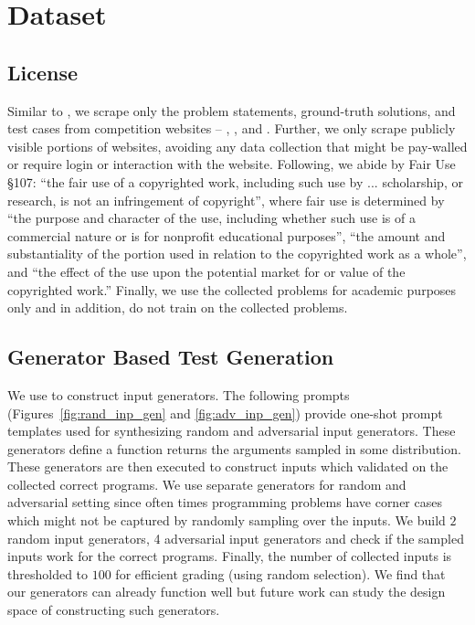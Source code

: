 \section{Dataset}

\subsection{License}
Similar to \citet{hendrycks2021measuring}, we scrape only the problem statements, ground-truth solutions, and test cases from competition websites -- \leetcode{}, \atcoder{}, and \codeforces{}. 
Further, we only scrape publicly visible portions of websites, avoiding any data collection that might be pay-walled or require login or interaction with the website.
Following, \citet{hendrycks2021measuring} we abide by Fair Use §107: “the fair
use of a copyrighted work, including such use by ... scholarship, or research, is not an infringement
of copyright”, where fair use is determined by “the purpose and character of the use, including
whether such use is of a commercial nature or is for nonprofit educational purposes”, “the amount
and substantiality of the portion used in relation to the copyrighted work as a whole”, and “the effect
of the use upon the potential market for or value of the copyrighted work.” 
Finally, we use the collected problems for academic purposes only and in addition, do not train on the collected problems.



\subsection{Generator Based Test Generation}
\label{appendix:input-generators}
We use \gptfourturbo{} to construct input generators. 
The following prompts (Figures~\ref{fig:rand_inp_gen} and \ref{fig:adv_inp_gen}) provide one-shot prompt templates used for synthesizing random and adversarial input generators.
These generators define a function returns the arguments sampled in some distribution.
These generators are then executed to construct inputs which validated on the collected correct programs.
We use separate generators for random and adversarial setting since often times programming problems have corner cases which might not be captured by randomly sampling over the inputs. We build $2$ random input generators, 4 adversarial input generators and check if the sampled inputs work for the correct programs. Finally, the number of collected inputs is thresholded to $100$ for efficient grading (using random selection). We find that our generators can already function well but future work can study the design space of constructing such generators. 

